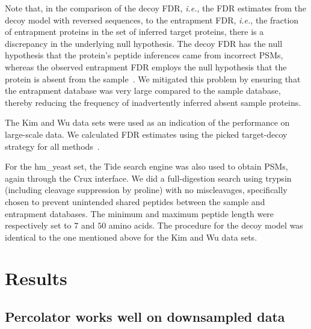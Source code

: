 \documentclass{article}
\begin{document}
Note that, in the comparison of the decoy FDR, {\em i.e.}, the FDR
estimates from the decoy model with reversed sequences, to the
entrapment FDR, {\em i.e.}, the fraction of entrapment proteins in the
set of inferred target proteins, there is a discrepancy in the
underlying null hypothesis. The decoy FDR has the null hypothesis that
the protein's peptide inferences came from incorrect PSMs, whereas the
observed entrapment FDR employs the null hypothesis that the protein
is absent from the sample~\cite{the:how}. We mitigated this problem by
ensuring that the entrapment database was very large compared to the
sample database, thereby reducing the frequency of inadvertently
inferred absent sample proteins.

The Kim and Wu data sets were used as an indication of the performance
on large-scale data. We calculated FDR estimates using the picked
target-decoy strategy for all methods~\cite{savitski2015scalable}.

For the hm\_yeast set, the Tide search engine was also used to obtain 
PSMs, again through the Crux interface. We did a full-digestion search 
using trypsin (including cleavage suppression by proline) with no 
miscleavages, specifically chosen to prevent unintended shared 
peptides between the sample and entrapment databases. The minimum and 
maximum peptide length were respectively set to $7$ and $50$ amino 
acids. The procedure for the decoy model was identical to the one 
mentioned above for the Kim and Wu data sets.

\section*{Results}

\subsection*{Percolator works well on downsampled data}
\end{document}
